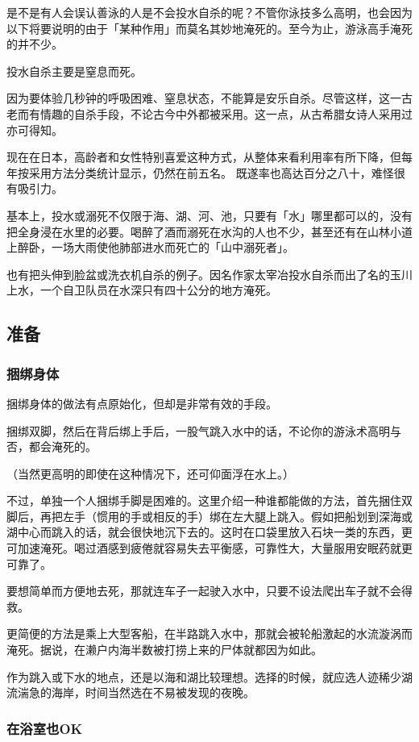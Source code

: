 \documentclass[UTF8]{ctexart}
\begin{document}
是不是有人会误认善泳的人是不会投水自杀的呢？不管你泳技多么高明，也会因为以下将要说明的由于「某种作用」而莫名其妙地淹死的。至今为止，游泳高手淹死的并不少。

投水自杀主要是窒息而死。

因为要体验几秒钟的呼吸困难、窒息状态，不能算是安乐自杀。尽管这样，这一古老而有情趣的自杀手段，不论古今中外都被采用。这一点，从古希腊女诗人采用过亦可得知。

现在在日本，高龄者和女性特别喜爱这种方式，从整体来看利用率有所下降，但每年按采用方法分类统计显示，仍然在前五名。
既遂率也高达百分之八十，难怪很 有吸引力。 

基本上，投水或溺死不仅限于海、湖、河、池，只要有「水」哪里都可以的，没有把全身浸在水里的必要。喝醉了酒而溺死在水沟的人也不少，甚至还有在山林小道上醉卧，一场大雨使他肺部进水而死亡的「山中溺死者」。

也有把头伸到脸盆或洗衣机自杀的例子。因名作家太宰冶投水自杀而出了名的玉川上水，一个自卫队员在水深只有四十公分的地方淹死。

\subsection{准备}

\subsubsection*{捆绑身体}

捆绑身体的做法有点原始化，但却是非常有效的手段。

捆绑双脚，然后在背后绑上手后，一股气跳入水中的话，不论你的游泳术高明与否，都会淹死的。

（当然更高明的即使在这种情况下，还可仰面浮在水上。）

不过，单独一个人捆绑手脚是困难的。这里介绍一种谁都能做的方法，首先捆住双脚后，再把左手（惯用的手或相反的手）绑在左大腿上跳入。假如把船划到深海或湖中心而跳入的话，就会很快地沉下去的。这时在口袋里放入石块一类的东西，更可加速淹死。喝过酒感到疲倦就容易失去平衡感，可靠性大，大量服用安眠药就更可靠了。

要想简单而方便地去死，那就连车子一起驶入水中，只要不设法爬出车子就不会得救。

更简便的方法是乘上大型客船，在半路跳入水中，那就会被轮船激起的水流漩涡而淹死。据说，在濑户内海半数被打捞上来的尸体就都因为如此。

作为跳入或下水的地点，还是以海和湖比较理想。选择的时候，就应选人迹稀少湖流湍急的海岸，时间当然选在不易被发现的夜晚。

\subsubsection*{在浴室也OK}
\end{document}
